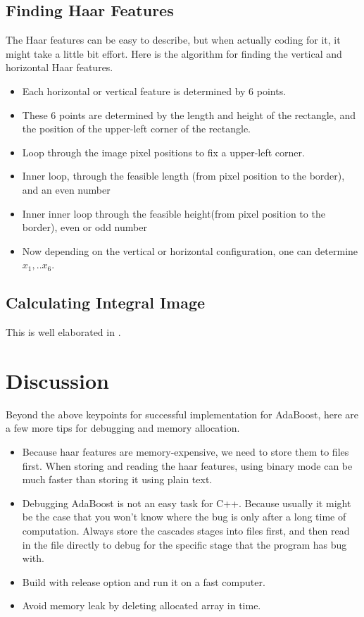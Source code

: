 \documentclass[12pt]{article}
\begin{document}
\subsection{Finding Haar Features}
The Haar features can be easy to describe, but when actually coding for it, it might take a little bit effort.
Here is the algorithm for finding the vertical and horizontal Haar features.
\begin{itemize}
\item Each horizontal or vertical feature is determined by 6 points.
\item These 6 points are determined by the length and height of the rectangle, and the position of the upper-left corner of the rectangle.
\item Loop through the image pixel positions to fix a upper-left corner.
\item Inner loop, through the feasible length (from pixel position to the border), and an even number
\item Inner inner loop through the feasible height(from pixel position to the border), even or odd number
\item Now depending on the vertical or horizontal configuration, one can determine $x_1,..x_6$.
\end{itemize}

\subsection{Calculating Integral Image}
This is well elaborated in \cite{Viola2004}.


\section{Discussion}
Beyond the above keypoints for successful implementation for AdaBoost, here are a few more tips for debugging and memory allocation.
\begin{itemize}
\item Because haar features are memory-expensive, we need to store them to files first. When storing and reading the haar features, using binary mode can be much faster than storing it using plain text.
\item Debugging AdaBoost is not an easy task for C++. Because usually it might be the case that you won't know where the bug is only after a long time of computation. Always store the cascades stages into files first, and then read in the file directly to debug for the specific stage that the program has bug with.
\item Build with release option and run it on a fast computer.
\item Avoid memory leak by deleting allocated array in time.
\end{itemize}
\end{document}
